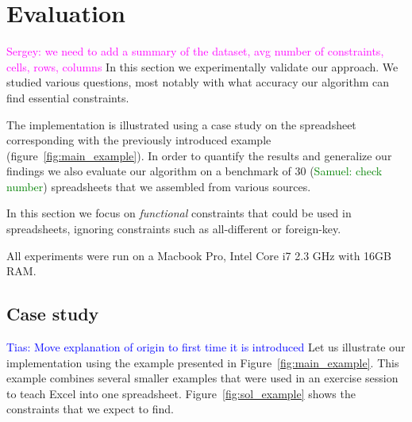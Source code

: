 \documentclass{ecai}
\newcommand{\sergey}[1]{\textcolor{magenta}{{\sc Sergey:} #1}\xspace}
\newcommand{\samuel}[1]{\textcolor{green}{{\sc Samuel:} #1}\xspace}
\newcommand{\tias}[1]{\textcolor{blue}{{\sc Tias:} #1}\xspace}
\begin{document}


\newcommand{\runtotal}{16.12}
\newcommand{\runtotalstd}{0.62}

\newcommand{\runfile}{0.50}
\newcommand{\runfilestd}{0.02}

\section{Evaluation}
\sergey{we need to add a summary of the dataset, avg number of constraints, cells, rows, columns}
In this section we experimentally validate our approach.
We studied various questions, most notably with what accuracy our algorithm can find essential constraints.

The implementation is illustrated using a case study on the spreadsheet corresponding with the previously introduced example (figure~\ref{fig:main_example}).
In order to quantify the results and generalize our findings we also evaluate our algorithm on a benchmark of 30 (\samuel{check number}) spreadsheets that we assembled from various sources.

In this section we focus on \textit{functional} constraints that could be used in spreadsheets, ignoring constraints such as all-different or foreign-key.

All experiments were run on a Macbook Pro, Intel Core i7 2.3 GHz with 16GB RAM.

\subsection{Case study}
\tias{Move explanation of origin to first time it is introduced}
Let us illustrate our implementation using the example presented in Figure~\ref{fig:main_example}.
This example combines several smaller examples that were used in an exercise session to teach Excel into one spreadsheet.
Figure~\ref{fig:sol_example} shows the constraints that we expect to find.
\end{document}
